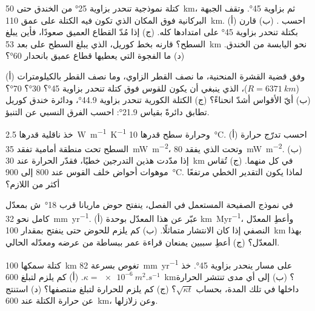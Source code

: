 \begin{exercise}[$\star\star$]\label{exo:b1:active-margins:6}
كتلة نموذجية تنحدر بزاوية \ang{25} من الخندق حتى \qty{50}{km}، ثم بزاوية \ang{45}. وتقف الجبهة البركانية فوق المكان الذي تكون فيه الكتلة على عمق \qty{110}{km}. (أ) احسب . (ب) قارن بكتلة تنحدر بزاوية \ang{45} على امتدادها كله. (ج) إذا مُدّ القطاع العميق صعودًا، فأين يبلغ السطح؟ قارنه بخط كوريل، الذي يبلغ السطح على بعد \qty{53}{km} نحو اليابسة من الخندق. (د) ما الفجوة التي يعطيها قطاع عميق بانحدار \ang{60}؟
\end{exercise}

\begin{exercise}[$\star\star$]\label{exo:b1:active-margins:7}
(أ) وفق قضية القشرة المنحنية، ما نصف القطر الزاوي، وما نصف القطر بالكيلومترات ($R = \qty{6371}{km}$)، الذي ينبغي أن يكون للقوس فوق كتلة تنحدر بزاوية \ang{45}؟ \ang{30}؟ \ang{70}؟ (ب) أيّ الأقواس أشدّ انحناءً؟ (ج) الكتلة الكورية تنحدر بزاوية \ang{44.9}، ودائرة خندق كوريل تطابق دائرةً بقياس \ang{21.9}: احسب الفرق النسبي عن التنبؤ.
\end{exercise}

\begin{exercise}[$\star\star$]\label{exo:b1:active-margins:8}
خذ ناقلية قدرها \qty{2.5}{W.m^{-1}.K^{-1}} وحرارة سطح قدرها \qty{10}{\celsius}. (أ) احسب تدرّج حرارة السطح تحت منطقة أمامية تفقد \qty{35}{mW.m^{-2}}، وتحت  الذي يفقد \qty{80}{mW.m^{-2}}. (ب) إذا مدّدت هذين التدرجين خطيًا، فقدّر الحرارة عند \qty{30}{km} في كل منهما. (ج) تُقاس موهوات أحواض خلف القوس عند 800 إلى \qty{900}{\celsius}. لماذا يكون التقدير الخطي مرتفعًا أكثر من اللازم؟
\end{exercise}

\begin{exercise}[$\star\star$]\label{exo:b1:active-margins:9}
في نموذج الصفيحة المستعمل في الفصل، ينفتح حوض ماريانا قرب \ang{18}~ش بمعدّل كامل نحو \qty{32}{mm.yr^{-1}}. (أ) عبّر عن هذا المعدّل بوحدة \unit{km.Myr^{-1}}، وأعطِ المعدّل النصفي إذا كان الانتشار متماثلًا. (ب) كم يلزم للحوض حتى ينفتح بمقدار \qty{100}{km} بهذا المعدّل؟ (ج) أعطِ سببين يمنعان قراءة عمر  ببساطة من عرضه ومعدّله الحالي.
\end{exercise}

\begin{exercise}[$\star\star\star$]\label{exo:b1:active-margins:10}
كتلة سمكها \qty{100}{km} تغوص بسرعة \qty{82}{mm.yr^{-1}} على مسار ينحدر بزاوية \ang{45}. خذ $\kappa = \qty{e-6}{m^2.s^{-1}}$. (أ) كم يلزم لتبلغ \qty{600}{km}؟ (ب) إلى أي مدى تنتشر الحرارة داخلها في تلك المدة، بحساب $\sqrt{\kappa t}$؟ (ج) كم يلزم للحرارة لتبلغ منتصفها؟ (د) استنتج عن حرارة الكتلة عند \qty{600}{km}، وعن زلازلها.
\end{exercise}


